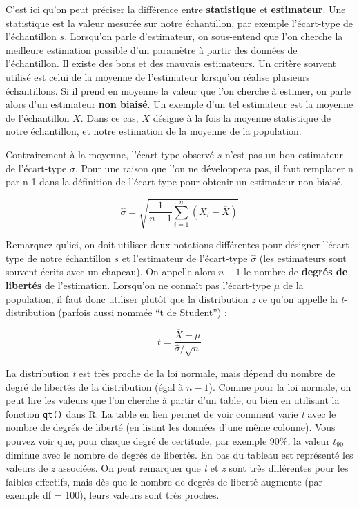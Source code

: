 \documentclass[
]{book}
\begin{document}
C'est ici qu'on peut préciser la différence entre \textbf{statistique} et \textbf{estimateur}. Une statistique est la valeur mesurée sur notre échantillon, par exemple l'écart-type de l'échantillon \(s\). Lorsqu'on parle d'estimateur, on sous-entend que l'on cherche la meilleure estimation possible d'un paramètre à partir des données de l'échantillon. Il existe des bons et des mauvais estimateurs. Un critère souvent utilisé est celui de la moyenne de l'estimateur lorsqu'on réalise plusieurs échantillons. Si il prend en moyenne la valeur que l'on cherche à estimer, on parle alors d'un estimateur \textbf{non biaisé}. Un exemple d'un tel estimateur est la moyenne de l'échantillon \(\overline{X}\). Dans ce cas, \(\overline{X}\) désigne à la fois la moyenne statistique de notre échantillon, et notre estimation de la moyenne de la population.

Contrairement à la moyenne, l'écart-type observé \(s\) n'est pas un bon estimateur de l'écart-type \(\sigma\). Pour une raison que l'on ne développera pas, il faut remplacer n par n-1 dans la définition de l'écart-type pour obtenir un estimateur non biaisé.

\[ \hat{\sigma} = \sqrt{\frac{1}{n-1}\sum_{i=1}^n{(X_i - \overline{X})}}\]

Remarquez qu'ici, on doit utiliser deux notations différentes pour désigner l'écart type de notre échantillon \(s\) et l'estimateur de l'écart-type \(\hat{\sigma}\) (les estimateurs sont souvent écrits avec un chapeau). On appelle alors \(n-1\) le nombre de \textbf{degrés de libertés} de l'estimation. Lorsqu'on ne connaît pas l'écart-type \(\mu\) de la population, il faut donc utiliser plutôt que la distribution \emph{z} ce qu'on appelle la \emph{t}-distribution (parfois aussi nommée ``t de Student'') :

\[ t = \frac{\overline{X} - \mu}{\hat{\sigma}/\sqrt{n}}\]

La distribution \emph{t} est très proche de la loi normale, mais dépend du nombre de degré de libertés de la distribution (égal à \(n-1\)). Comme pour la loi normale, on peut lire les valeurs que l'on cherche à partir d'un \href{https://www.sjsu.edu/faculty/gerstman/StatPrimer/t-table.pdf}{table}, ou bien en utilisant la fonction \texttt{qt()} dans R. La table en lien permet de voir comment varie \emph{t} avec le nombre de degrés de liberté (en lisant les données d'une même colonne). Vous pouvez voir que, pour chaque degré de certitude, par exemple 90\%, la valeur \(t_{90}\) diminue avec le nombre de degrés de libertés. En bas du tableau est représenté les valeurs de \emph{z} associées. On peut remarquer que \emph{t} et \emph{z} sont très différentes pour les faibles effectifs, mais dès que le nombre de degrés de liberté augmente (par exemple df = 100), leurs valeurs sont très proches.
\end{document}
